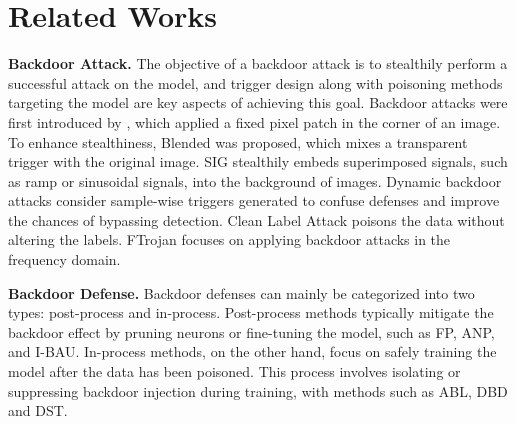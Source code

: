 \section{Related Works}
\textbf{Backdoor Attack.} The objective of a backdoor attack is to stealthily perform a successful attack on the model, and trigger design along with poisoning methods targeting the model are key aspects of achieving this goal.  Backdoor attacks were first introduced by \cite{gu2017badnets}, which applied a fixed pixel patch in the corner of an image. To enhance stealthiness, Blended\cite{blended} was proposed, which mixes a transparent trigger with the original image. SIG\cite{SIG} stealthily embeds superimposed signals, such as ramp or sinusoidal signals, into the background of images. Dynamic\cite{Dynamic} backdoor attacks consider sample-wise triggers generated to confuse defenses and improve the chances of bypassing detection. Clean Label Attack\cite{CL} poisons the data without altering the labels. FTrojan\cite{FTrojan} focuses on applying backdoor attacks in the frequency domain. 

\noindent\textbf{Backdoor Defense.} Backdoor defenses can mainly be categorized into two types: post-process and in-process. Post-process methods typically mitigate the backdoor effect by pruning neurons or fine-tuning the model, such as FP\cite{FP}, ANP\cite{ANP}, and I-BAU\cite{I_BAU}. In-process methods, on the other hand, focus on safely training the model after the data has been poisoned. This process involves isolating or suppressing backdoor injection during training, with methods such as ABL\cite{ABL}, DBD \cite{huang2022backdoor} and DST\cite{DST}.